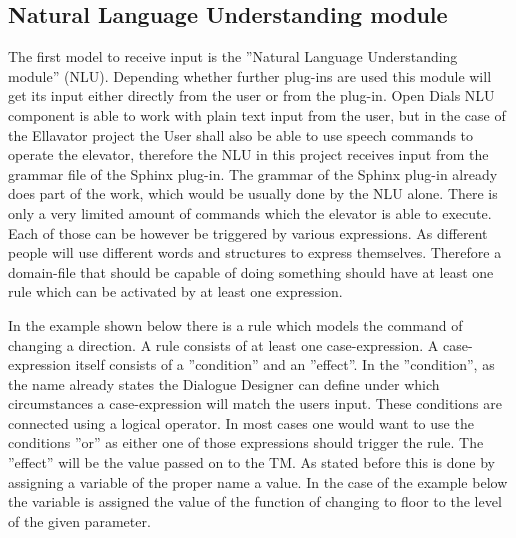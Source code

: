 \subsection{Natural Language Understanding module}

The first model to receive input is the ”Natural Language Understanding module” (NLU). 
Depending whether further plug-ins are used this module will get its input either directly from the user or from the plug-in.
Open Dials NLU component is able to work with plain text input from the user, but in the case of the Ellavator project the User shall also be able to use speech commands to operate the elevator, therefore the NLU in this project receives input from the grammar file of the Sphinx plug-in.
The grammar of the Sphinx plug-in already does part of the work, which would be usually done by the NLU alone.
There is only a very limited amount of commands which the elevator is able to execute.
Each of those can be however be triggered by various expressions. As different people will use different words and structures to express themselves.
Therefore a domain-file that should be capable of doing something should have at least one rule which can be activated by at least one expression. \newline

In the example shown below there is a rule which models the command of changing a direction.
A rule consists of at least one case-expression.
A case-expression itself consists of a ”condition” and an ”effect”.
 In the ”condition”, as the name already states the Dialogue Designer can define under which circumstances a case-expression will match the users input.
These conditions are connected using a logical operator.
In most cases one would want to use the conditions ”or” as either one of those expressions should trigger the rule.
 The ”effect” will be the value passed on to the TM.
As stated before this is done by assigning a variable of the proper name a value.
In the case of the example below the variable is assigned the value of the function of changing to floor to the level of the given parameter. 
\newline


